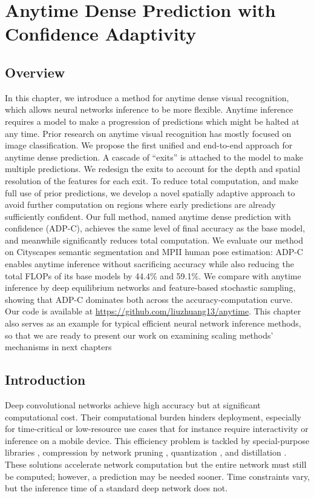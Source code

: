 \chapter{Anytime Dense Prediction with Confidence Adaptivity}

\section{Overview}
In this chapter, we introduce a method for anytime dense visual recognition, which allows neural networks inference to be more flexible. Anytime inference requires a model to make a progression of predictions which might be halted at any time. Prior research on anytime visual recognition has mostly focused on image classification. We propose the first unified and end-to-end approach for anytime dense prediction. A cascade of ``exits'' is attached to the model to make multiple predictions. We redesign the exits to account for the depth and spatial resolution of the features for each exit. To reduce total computation, and make full use of prior predictions, we develop a novel spatially adaptive approach to avoid further computation on regions where early predictions are already sufficiently confident. Our full method, named anytime dense prediction with confidence (ADP-C), achieves the same level of final accuracy as the base model, and meanwhile significantly reduces total computation. We evaluate our method on Cityscapes semantic segmentation and MPII human pose estimation: ADP-C enables anytime inference without sacrificing accuracy while also reducing the total FLOPs of its base models by 44.4\% and 59.1\%. We compare with anytime inference by deep equilibrium networks and feature-based stochastic sampling, showing that ADP-C dominates both across the accuracy-computation curve. Our code is available at \url{https://github.com/liuzhuang13/anytime}. This chapter also serves as an example for typical efficient neural network inference methods, so that we are ready to present our work on examining scaling methods' mechanisms in next chapters

\section{Introduction}
Deep convolutional networks \cite{alexnet,resnet} achieve high accuracy but at significant computational cost.
Their computational burden hinders deployment, especially for time-critical or low-resource use cases that for instance require interactivity or inference on a mobile device.
This efficiency problem is tackled by special-purpose libraries \cite{chetlur2014cudnn}, compression by network pruning
\cite{han2015learning,li2016pruning,liu2019rethinking}, quantization \cite{xnornet,jacob2018quantization}, and distillation \cite{hinton2015distilling,fitnet}.
These solutions accelerate network computation but the entire network must still be computed; however, a prediction may be needed sooner.
Time constraints vary, but the inference time of a standard deep network does not.


